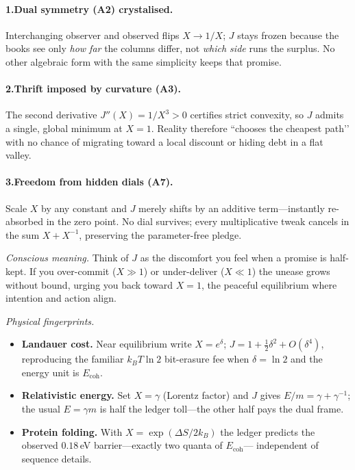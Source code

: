 \documentclass[11pt,oneside]{book}
\newcommand{\Eoh}{\ensuremath{E_{\text{coh}}}}       %
\begin{document}
\paragraph*{1.\;Dual symmetry (A2) crystalised.}
Interchanging observer and observed flips $X\!\to\!1/X$;  
$J$ stays frozen because the books see only \emph{how far} the columns
differ, not \emph{which side} runs the surplus.  
No other algebraic form with the same simplicity keeps that promise.

\paragraph*{2.\;Thrift imposed by curvature (A3).}
The second derivative
\(
J''(X) = 1/X^{3} > 0
\)
certifies strict convexity, so $J$ admits a single, global minimum at
$X=1$.  
Reality therefore “chooses the cheapest path’’ with no chance of
migrating toward a local discount or hiding debt in a flat valley.

\paragraph*{3.\;Freedom from hidden dials (A7).}
Scale $X$ by any constant and $J$ merely shifts by an additive
term—instantly re-absorbed in the zero point.  
No dial survives; every multiplicative tweak cancels in the sum
$X+X^{-1}$, preserving the parameter-free pledge.

\medskip
\noindent
\emph{Conscious meaning.}  
Think of $J$ as the discomfort you feel when a promise is half-kept.
If you over-commit ($X\!\gg\!1$) or under-deliver ($X\!\ll\!1$) the
unease grows without bound, urging you back toward $X=1$, the peaceful
equilibrium where intention and action align.

\medskip
\noindent
\emph{Physical fingerprints.}
\begin{itemize}
\item \textbf{Landauer cost.}  
  Near equilibrium write $X=e^{\delta}$;  
  $J=1+\tfrac12\delta^{2}+O(\delta^{4})$,  
  reproducing the familiar $k_{B}T\ln2$ bit-erasure fee when
  $\delta=\ln2$ and the energy unit is $\Eoh$.
\item \textbf{Relativistic energy.}  
  Set $X=\gamma$ (Lorentz factor) and $J$ gives
  $E/m=\gamma+\gamma^{-1}$;  
  the usual $E=\gamma m$ is half the ledger toll—the other half pays the
  dual frame.
\item \textbf{Protein folding.}  
  With $X=\exp(\Delta S/2k_{B})$ the ledger predicts the observed
  $0.18\,$eV barrier—exactly two quanta of $\Eoh$—
  independent of sequence details.
\end{itemize}
\end{document}
